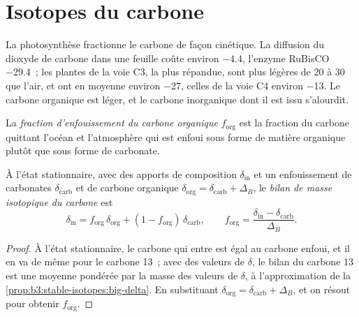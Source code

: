 \section{Isotopes du carbone}\label{sec:b3:stable-isotopes:carbon}

La photosynthèse fractionne le carbone de façon cinétique. La diffusion du dioxyde de
carbone dans une feuille coûte environ \qty{-4.4}{\permil}, l'enzyme RuBisCO
\qty{-29.4}{\permil}~; les plantes de la voie C3, la plus répandue, sont plus légères de \num{20} à
\qty{30}{\permil} que l'air, et ont en moyenne environ
\qty{-27}{\permil}, celles de la voie C4 environ \qty{-13}{\permil}. Le carbone organique
est léger, et le carbone inorganique dont il est issu s'alourdit.

\begin{definition}\label{def:b3:stable-isotopes:forg}
La \emph{fraction d'enfouissement du carbone organique}
$f_{\mathrm{org}}$ est la fraction du carbone quittant l'océan et
l'atmosphère qui est enfoui sous forme de matière organique plutôt que sous forme de carbonate.
\end{definition}

\begin{proposition}\label{prop:b3:stable-isotopes:forg}
À l'état stationnaire, avec des apports de composition $\delta_{\mathrm{in}}$ et un enfouissement de
carbonates $\delta_{\mathrm{carb}}$ et de carbone organique $\delta_{\mathrm{org}} =
\delta_{\mathrm{carb}} + \Delta_B$, le \emph{bilan de masse isotopique
du carbone} est
\[
\delta_{\mathrm{in}} = f_{\mathrm{org}}\,\delta_{\mathrm{org}} + (1 - f_{\mathrm{org}})\,
\delta_{\mathrm{carb}}, \qquad f_{\mathrm{org}} = \frac{\delta_{\mathrm{in}} -
\delta_{\mathrm{carb}}}{\Delta_B}.
\]
\end{proposition}

\begin{proof}
À l'état stationnaire, le carbone qui entre est égal au carbone enfoui, et il en va de même
pour le carbone 13~; avec des valeurs de $\delta$, le bilan du carbone 13 est une moyenne pondérée par la masse
des valeurs de $\delta$, à l'approximation de la
\cref{prop:b3:stable-isotopes:big-delta}. En substituant $\delta_{\mathrm{org}} =
\delta_{\mathrm{carb}} + \Delta_B$, et on résout pour obtenir $f_{\mathrm{org}}$.
\end{proof}

